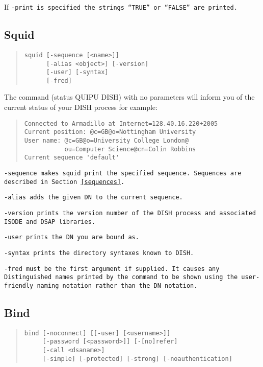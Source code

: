 If \tt -print\rm \  is specified the strings ``TRUE'' or ``FALSE'' are printed.

\subsection {Squid}

\begin{quote}\begin{verbatim}
squid [-sequence [<name>]] 
      [-alias <object>] [-version]
      [-user] [-syntax]
      [-fred]
\end{verbatim}\end{quote}

The command  (status QUIPU DISH) with no 
parameters will inform you of the current status
of your DISH process for example:
\begin{quote}\begin{verbatim}
Connected to Armadillo at Internet=128.40.16.220+2005
Current position: @c=GB@o=Nottingham University
User name: @c=GB@o=University College London@
           ou=Computer Science@cn=Colin Robbins
Current sequence 'default'
\end{verbatim}\end{quote}

\tt -sequence\rm \ makes squid print the specified sequence.
Sequences are described in Section~\ref{sequences}.

\tt -alias\rm \ adds the given DN to the current sequence.

\tt -version\rm \ prints the version number of the DISH process and
associated ISODE and DSAP libraries.

\tt -user\rm\ prints the DN you are bound as.

\tt -syntax\rm\ prints the directory syntaxes known to DISH.

\tt -fred\rm\ must be the first argument if supplied. It causes
any Distinguished names printed by the command to be shown
using the user-friendly naming
notation rather than the DN notation.

\subsection {Bind}
\label{dish_bind}

\begin{quote}\begin{verbatim}
bind [-noconnect] [[-user] [<username>]] 
     [-password [<password>]] [-[no]refer]
     [-call <dsaname>]
     [-simple] [-protected] [-strong] [-noauthentication]
\end{verbatim}\end{quote}

